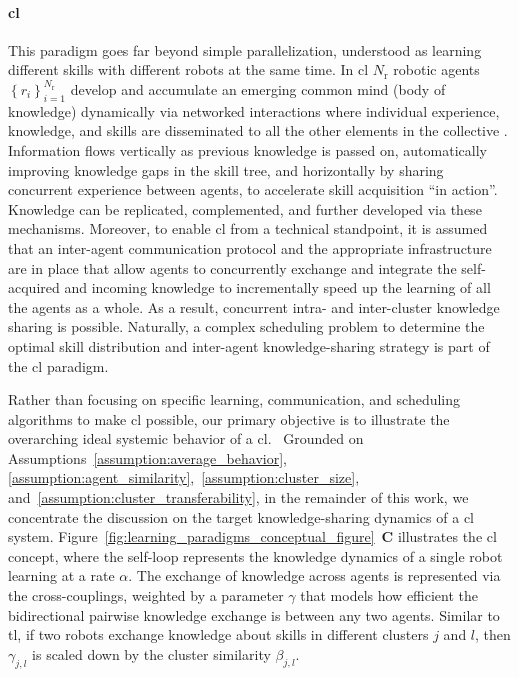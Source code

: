 \documentclass[12pt]{article}
\begin{document}

\paragraph*{\textbf{\Acl{cl}}}
This paradigm goes far beyond simple parallelization, understood as learning different skills with different robots at the same time. In \ac{cl} $N_\mathrm{r}$ robotic agents $ \left\lbrace r_i \right\rbrace_{i=1}^{N_\mathrm{r}} $ develop and accumulate an emerging common mind (body of knowledge) dynamically via networked interactions where individual experience, knowledge, and skills are disseminated to all the other elements in the collective \cite{Garavan2012CollectiveLearning}. Information flows vertically as previous knowledge is passed on, automatically improving knowledge gaps in the skill tree, and horizontally by sharing concurrent experience between agents, to accelerate skill acquisition ``in action''. Knowledge can be replicated, complemented, and further developed via these mechanisms. Moreover, to enable \ac{cl} from a technical standpoint, it is assumed that an inter-agent communication protocol and the appropriate infrastructure are in place that allow agents to concurrently exchange and integrate the self-acquired and incoming knowledge to incrementally speed up the learning of all the agents as a whole. As a result, concurrent intra- and inter-cluster knowledge sharing is possible. Naturally, a complex scheduling problem to determine the optimal skill distribution and inter-agent knowledge-sharing strategy is part of the \ac{cl} paradigm. 

Rather than focusing on specific learning, communication, and scheduling algorithms to make \ac{cl} possible, our primary objective is to illustrate the overarching ideal systemic behavior of a \acl{cl}.~%
Grounded on Assumptions~\ref{assumption:average_behavior}, \ref{assumption:agent_similarity},~\ref{assumption:cluster_size}, and~\ref{assumption:cluster_transferability}, in the remainder of this work, we concentrate the discussion on the target knowledge-sharing dynamics of a \ac{cl} system. Figure~\ref{fig:learning_paradigms_conceptual_figure}~\textbf{C} illustrates the \ac{cl} concept, where the self-loop represents the knowledge dynamics of a single robot learning at a rate $\alpha$. The exchange of knowledge across agents is represented via the cross-couplings, weighted by a parameter $\gamma$ that models how efficient the bidirectional pairwise knowledge exchange is between any two agents. Similar to \ac{tl}, if two robots exchange knowledge about skills in different clusters $j$ and $l$, then $\gamma_{j,l}$ is scaled down by the cluster similarity $\beta_{j,l}$. 
\end{document}
